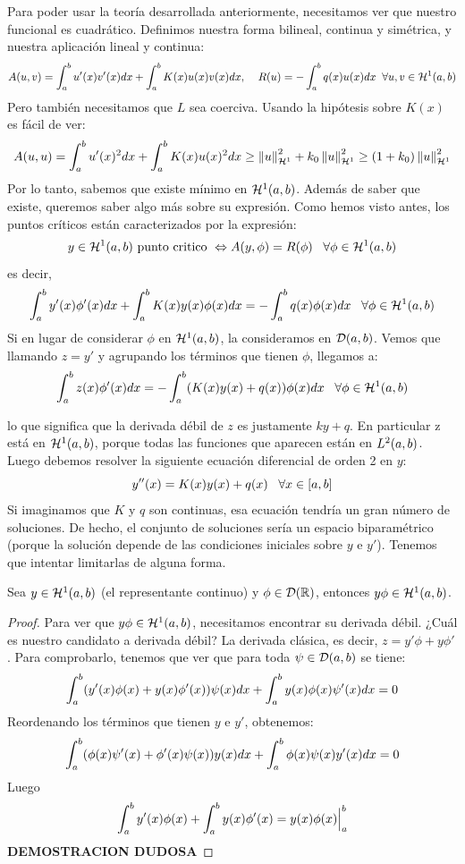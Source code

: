 Para poder usar la teoría desarrollada anteriormente, necesitamos ver que nuestro funcional es cuadrático. Definimos nuestra forma bilineal, continua y simétrica, y nuestra aplicación lineal y continua:
\[
A(u,v)=\integral{a}{b}{u'(x)v'(x)dx}+\integral{a}{b}{K(x)u(x)v(x)dx}, \; \espacio R(u)=-\integral{a}{b}{q(x)u(x)dx} \;\;\forall u,v\in\sobolev{1}
\]
Pero también necesitamos que $L$ sea coerciva. Usando la hipótesis sobre $K(x)$ es fácil de ver:
\[
A(u,u)=\integral{a}{b}{u'(x)^2dx}+\integral{a}{b}{K(x)u(x)^2dx}\geq\normasobolev{1}{u}^2+k_0\normasobolev{1}{u}^2\geq(1+k_0)\normasobolev{1}{u}^2
\]
Por lo tanto, sabemos que existe mínimo en $\sobolev{1}$. Además de saber que existe, queremos saber algo más sobre su expresión. Como hemos visto antes, los puntos críticos están caracterizados por la expresión:
\[
y\in\sobolev{1} \text{ punto critico } \Leftrightarrow A(y,\phi)=R(\phi) \espacio \forall \phi\in\sobolev{1}
\]
es decir,
\[
\integral{a}{b}{y'(x)\phi'(x)dx}+\integral{a}{b}{K(x)y(x)\phi(x)dx}=-\integral{a}{b}{q(x)\phi(x)dx} \espacio  \forall\phi\in\sobolev{1}
\]
Si en lugar de considerar $\phi$ en $\sobolev{1}$, la consideramos en $\soportecompacto$. Vemos que llamando $z=y'$ y agrupando los términos que tienen $\phi$, llegamos a:
\[
\integral{a}{b}{z(x)\phi'(x)dx}=-\integral{a}{b}{(K(x)y(x)+q(x))\phi(x)dx} \espacio  \forall\phi\in\sobolev{1}
\]

lo que significa que la derivada débil de $z$ es justamente $ky+q$. En particular z está en $\sobolev{1}$, porque todas las funciones que aparecen están en $\lebesgue{2}$. Luego debemos resolver la siguiente ecuación diferencial de orden 2 en $y$:
\[
y''(x)=K(x)y(x)+q(x) \espacio \forall x \in[a,b]
\]
Si imaginamos que $K$ y $q$ son continuas, esa ecuación tendría un gran número de soluciones. De hecho, el conjunto de soluciones sería un espacio biparamétrico (porque la solución depende de las condiciones iniciales sobre $y$ e $y'$). Tenemos que intentar limitarlas de alguna forma.

\begin{prop}
Sea $y\in\sobolev{1}$ (el representante continuo) y $\phi\in\mathcal{D}(\R)$, entonces $y\phi\in\sobolev{1}$.
\end{prop}
\begin{proof}
Para ver que $y\phi\in\sobolev{1}$, necesitamos encontrar su derivada débil. ¿Cuál es nuestro candidato a derivada débil? La derivada clásica, es decir, $z=y'\phi+y\phi'$. Para comprobarlo, tenemos que ver que para toda $\psi\in\soportecompacto$ se tiene:
\[
\integral{a}{b}{(y'(x)\phi(x)+y(x)\phi'(x))\psi(x)dx}+\integral{a}{b}{y(x)\phi(x)\psi'(x)dx}=0
\]
Reordenando los términos que tienen $y$ e $y'$, obtenemos:
\[
\integral{a}{b}{(\phi(x)\psi'(x)+\phi'(x)\psi(x))y(x)dx}+\integral{a}{b}{\phi(x)\psi(x)y'(x)dx}=0
\]
Luego
\[
\integral{a}{b}{y'(x)\phi(x)}+\integral{a}{b}{y(x)\phi'(x)}=y(x)\phi(x)\Big|^b_a
\] 
\textbf{DEMOSTRACION DUDOSA}
\end{proof}

